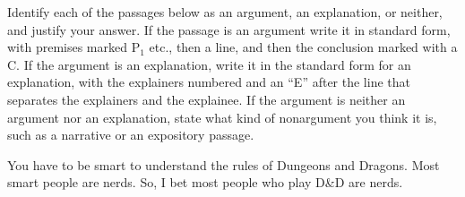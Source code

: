 {\begin{exercises}
{
}{\vspace{1.5in}}

\end{exercises}


\noindent\problempart Identify each of the passages below as an argument, an explanation, or neither, and justify your answer. If the passage is an argument write it in standard form, with premises marked P$_1$ etc., then a line, and then the conclusion marked with a C. If the argument is an explanation, write it in the standard form for an explanation, with the explainers numbered and an ``E'' after the line that separates the explainers and the explainee. If the argument is neither an argument nor an explanation, state what kind of nonargument you think it is, such as a narrative or an expository passage.

 
\begin{exercises}

\item You have to be smart to understand the rules of Dungeons and Dragons. Most smart people are nerds. So, I bet most people who play D\&D are nerds.


%





\end{exercises}}
